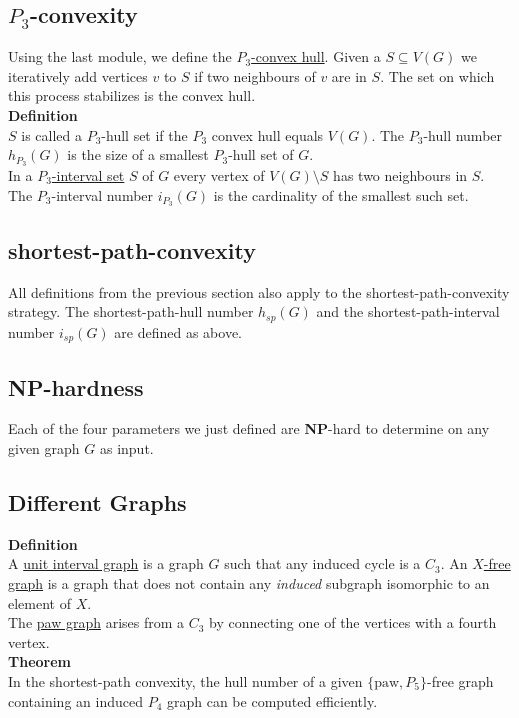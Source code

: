 \documentclass[a4paper, 12pt]{article}
\begin{document}
	\subsection{$P_3$-convexity}
	Using the last module, we define the \underline{$P_3$-convex hull}. Given a $S \subseteq V(G)$ we iteratively add vertices $v$ to $S$ if two neighbours of $v$ are in $S$. The set on which this process stabilizes is the convex hull.\\
	\textbf{Definition}\\
	$S$ is called a $P_3$-hull set if the $P_3$ convex hull equals $V(G)$. The $P_3$-hull number $h_{P_3}(G)$ is the size of a smallest $P_3$-hull set of $G$.\\
	In a \underline{$P_3$-interval set} $S$ of $G$ every vertex of $V(G)\setminus S$ has two neighbours in $S$. The $P_3$-interval number $i_{P_3}(G)$ is the cardinality of the smallest such set.
	
	\subsection{shortest-path-convexity}
	All definitions from the previous section also apply to the shortest-path-convexity strategy. The shortest-path-hull number $h_{sp}(G)$ and the shortest-path-interval number $i_{sp}(G)$ are defined as above.
	
	\subsection{NP-hardness}
	Each of the four parameters we just defined are \textbf{NP}-hard to determine on any given graph $G$ as input.
	
	\subsection{Different Graphs}
	\textbf{Definition}\\
	A \underline{unit interval graph} is a graph $G$ such that any induced cycle is a $C_3$.
	An \underline{$X$-free graph} is a graph that does not contain any \textit{induced} subgraph isomorphic to an element of $X$.\\
	The \underline{paw graph} arises from a $C_3$ by connecting one of the vertices with a fourth vertex.\\
	\textbf{Theorem}\\
	In the shortest-path convexity, the hull number of a given $\{\text{paw}, P_5\}$-free graph containing an induced $P_4$ graph can be computed efficiently.\\
	
\end{document}
